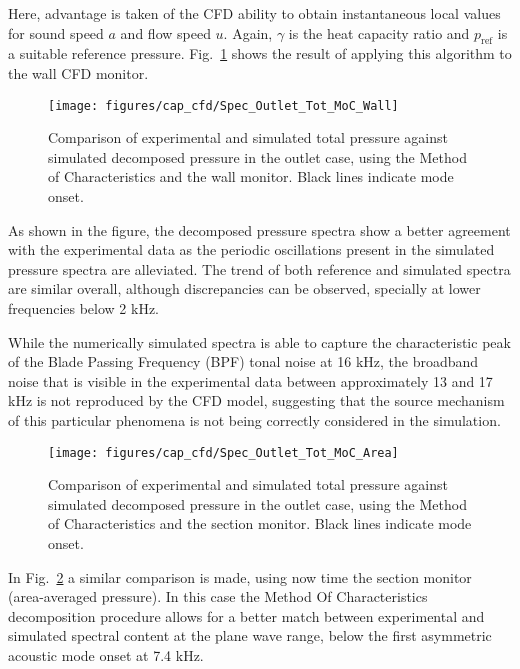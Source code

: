 Here, advantage is taken of the CFD ability to obtain instantaneous local values for sound speed $a$ and flow speed $u$. Again, $\gamma$ is the heat capacity ratio and $p_\text{ref}$ is a suitable reference pressure. Fig.~\ref{fig:cfd_Spec_Outlet_Tot_Moc_Wall} shows the result of applying this algorithm to the wall CFD monitor.

\begin{figure}[htb!]
\centering
\texttt{[image: figures/cap\_cfd/Spec\_Outlet\_Tot\_MoC\_Wall]}
\caption{Comparison of experimental and simulated total pressure against simulated decomposed pressure in the outlet case, using the Method of Characteristics and the wall monitor. Black lines indicate mode onset.}
\label{fig:cfd_Spec_Outlet_Tot_Moc_Wall}
\end{figure}

As shown in the figure, the decomposed pressure spectra show a better agreement with the experimental data as the periodic oscillations present in the simulated pressure spectra are alleviated. The trend of both reference and simulated spectra are similar overall, although discrepancies can be observed, specially at lower frequencies below 2 kHz. 

While the numerically simulated spectra is able to capture the characteristic peak of the Blade Passing Frequency (BPF) tonal noise at 16 kHz, the broadband noise that is visible in the experimental data between approximately 13 and 17 kHz is not reproduced by the CFD model, suggesting that the source mechanism of this particular phenomena is not being correctly considered in the simulation.

\begin{figure}[htb!]
\centering
\texttt{[image: figures/cap\_cfd/Spec\_Outlet\_Tot\_MoC\_Area]}
\caption{Comparison of experimental and simulated total pressure against simulated decomposed pressure in the outlet case, using the Method of Characteristics and the section monitor. Black lines indicate mode onset.}
\label{fig:cfd_Spec_Outlet_Tot_Moc_Area}
\end{figure}

In Fig.~\ref{fig:cfd_Spec_Outlet_Tot_Moc_Area} a similar comparison is made, using now time the section monitor (area-averaged pressure). In this case the Method Of Characteristics decomposition procedure allows for a better match between experimental and simulated spectral content at the plane wave range, below the first asymmetric acoustic mode onset at 7.4 kHz.

